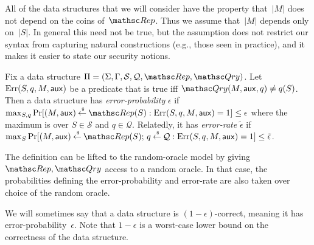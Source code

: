 All of the data structures that we will consider have the property that~$|M|$ does not depend on the coins of~$\Rep$. Thus we assume that~$|M|$ depends only on~$|S|$.  In general this need not be true, but the assumption does not restrict our syntax from capturing natural constructions (e.g., those seen in practice), and it makes it easier to state our security notions.

\begin{definition} \rm
Fix a data structure $\setprim=(\Sigma,\Gamma,\calS,\calQ,\Rep, \Qry)$.
Let $\mathrm{Err}(S,q,M,{\sf aux})$ be a predicate that is true iff $\Qry(M, \aux, q) \neq q(S)$.  Then a data structure
has \emph{error-probability} $\epsilon$ if
$\max_{S,q}\Pr[(M,\aux) \getsr \Rep(S) : \mathrm{Err}(S,q,M,\aux)=1 ] \leq \epsilon$
where the maximum is over $S \in \mathcal{S}$ and $q \in \mathcal{Q}$.  
%
Relatedly, it has \emph{error-rate} $\tilde{\epsilon}$ if
$\max_{S}\Pr[(M,\aux) \getsr \Rep(S);\, q \getsr \calQ : \mathrm{Err}(S,q,M,\aux)=1] \leq \tilde{\epsilon}$.
\hfill\dqed
\end{definition}

\noindent
The definition can be lifted to the random-oracle model
by giving $\Rep, \Qry$ access to a random oracle. In that case,
the probabilities defining the error-probability and error-rate are also taken over choice of the random oracle.

We will sometimes say that a data structure is $(1-\epsilon)$-correct, meaning it has error-probability~$\epsilon$.  Note that $1-\epsilon$ is a worst-case lower bound on the correctness of the data structure.


